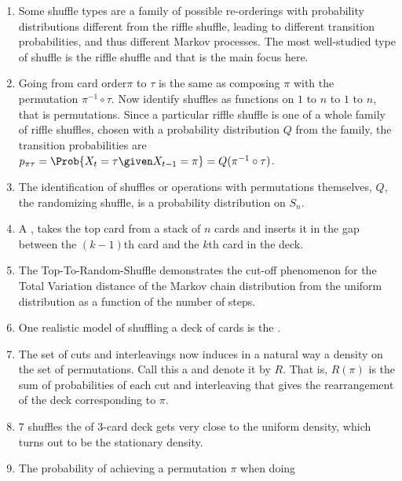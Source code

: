 \documentclass[12pt]{article}
\begin{document}
\begin{enumerate}
\item
  Some shuffle types are a family of possible re-orderings with
  probability distributions different from the riffle shuffle, leading
  to different transition probabilities, and thus different Markov
  processes.  The most well-studied type of shuffle is the riffle
  shuffle and that is the main focus here.
\item Going from card order\( \pi \) to \( \tau \) is the same as
  composing \( \pi \) with the permutation \( \pi^{-1} \circ \tau \).
  Now identify shuffles as functions on \( 1 \) to \( n \) to \( 1 \)
  to \( n \), that is permutations.  Since a particular riffle shuffle
  is one of a whole family of riffle shuffles, chosen with a
  probability distribution \( Q \) from the family, the transition
  probabilities are
  \( p_{\pi \tau} = \Prob{X_t = \tau \given X_{t-1} = \pi} =
  Q(\pi^{-1} \circ \tau) \).
\item 
        The identification of shuffles or operations with permutations
        themselves, \( Q \), the randomizing shuffle, is a probability
        distribution on \( S_n \).
     \item
        A ,%
        takes the top card from a stack of \(
        n \) cards and inserts it in the gap between the \( (k-1) \)th
        card and the \( k \)th card in the deck.
      \item
        The Top-To-Random-Shuffle demonstrates the cut-off phenomenon for the Total
    Variation distance of the Markov chain distribution from the uniform
    distribution as a function of the number of steps.
    \item
        One realistic model of shuffling a deck of cards is the .
    \item
        The set of cuts and interleavings now induces in a natural way a
        density on the set of permutations.  Call this a  and denote it by \( R \).  That is, \( R(\pi) \) is the
        sum of probabilities of each cut and interleaving that gives the
        rearrangement of the deck corresponding to \( \pi \).
    \item
        \( 7 \) shuffles the of 3-card deck gets very close to the
        uniform density, which turns out to be the stationary density.
     \item
        The probability of achieving a permutation \( \pi \) when doing

\end{enumerate}
\end{document}
